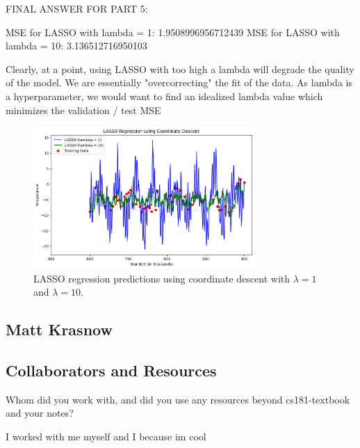 \documentclass[submit]{../harvardml}
\begin{document}
\begin{tcolorbox}[title=Solution, colback=white, colframe=black, breakable]
\begin{enumerate}
    FINAL ANSWER FOR PART 5: \newline

 

    MSE for LASSO with lambda = 1: 1.9508996956712439 \newline
    MSE for LASSO with lambda = 10: 3.136512716950103

    Clearly, at a point, using LASSO with too high a lambda will degrade the quality of the model. We are essentially "overcorrecting" the fit of the data. As lambda is a hyperparameter, we would want to find an idealized lambda value which minimizes the validation / test MSE

  
  \end{enumerate}
  \end{tcolorbox}
  \begin{figure}[h]
    \centering
    \includegraphics[width=0.75\textwidth]{img_output/p4.5.png}
    \caption{LASSO regression predictions using coordinate descent with $\lambda=1$ and $\lambda=10$.}
  \end{figure}



\newpage
\subsection*{Matt Krasnow}

\subsection*{Collaborators and Resources}
Whom did you work with, and did you use any resources beyond cs181-textbook and your notes?

I worked with me myself and I because im cool
\end{document}
